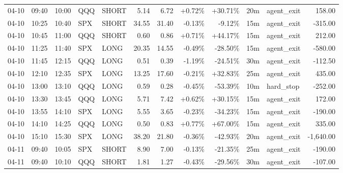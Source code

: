 \documentclass[11pt,a4paper]{article}
\begin{document}
\begin{center}
\begin{longtable}{>{\color{txtmain}}l l l l l r r r r r >{\color{txtmain}}l r}
04-10 & 09:40 & 10:00 & QQQ & SHORT & 5.14 & 6.72 & \textcolor{wingreen}{+0.72\%} & \textcolor{wingreen}{+30.71\%} & 20m & agent\_exit & \textcolor{wingreen}{158.00} \\
04-10 & 10:25 & 10:40 & SPX & SHORT & 34.55 & 31.40 & \textcolor{lossred}{-0.13\%} & \textcolor{lossred}{-9.12\%} & 15m & agent\_exit & \textcolor{lossred}{-315.00} \\
04-10 & 10:45 & 11:00 & QQQ & SHORT & 0.60 & 0.86 & \textcolor{wingreen}{+0.71\%} & \textcolor{wingreen}{+44.17\%} & 15m & agent\_exit & \textcolor{wingreen}{212.00} \\
04-10 & 11:25 & 11:40 & SPX & LONG & 20.35 & 14.55 & \textcolor{lossred}{-0.49\%} & \textcolor{lossred}{-28.50\%} & 15m & agent\_exit & \textcolor{lossred}{-580.00} \\
04-10 & 11:45 & 12:15 & QQQ & LONG & 0.51 & 0.39 & \textcolor{lossred}{-1.19\%} & \textcolor{lossred}{-24.51\%} & 30m & agent\_exit & \textcolor{lossred}{-112.50} \\
04-10 & 12:10 & 12:35 & SPX & LONG & 13.25 & 17.60 & \textcolor{lossred}{-0.21\%} & \textcolor{wingreen}{+32.83\%} & 25m & agent\_exit & \textcolor{wingreen}{435.00} \\
04-10 & 13:00 & 13:10 & QQQ & LONG & 0.59 & 0.28 & \textcolor{lossred}{-0.45\%} & \textcolor{lossred}{-53.39\%} & 10m & hard\_stop & \textcolor{lossred}{-252.00} \\
04-10 & 13:30 & 13:45 & QQQ & LONG & 5.71 & 7.42 & \textcolor{wingreen}{+0.62\%} & \textcolor{wingreen}{+30.15\%} & 15m & agent\_exit & \textcolor{wingreen}{172.00} \\
04-10 & 13:55 & 14:10 & SPX & LONG & 5.55 & 3.65 & \textcolor{lossred}{-0.23\%} & \textcolor{lossred}{-34.23\%} & 15m & agent\_exit & \textcolor{lossred}{-190.00} \\
04-10 & 14:10 & 14:25 & QQQ & LONG & 0.50 & 0.83 & \textcolor{wingreen}{+0.77\%} & \textcolor{wingreen}{+67.00\%} & 15m & agent\_exit & \textcolor{wingreen}{335.00} \\
04-10 & 15:10 & 15:30 & SPX & LONG & 38.20 & 21.80 & \textcolor{lossred}{-0.36\%} & \textcolor{lossred}{-42.93\%} & 20m & agent\_exit & \textcolor{lossred}{-1,640.00} \\
04-11 & 09:40 & 10:05 & SPX & SHORT & 8.90 & 7.00 & \textcolor{lossred}{-0.13\%} & \textcolor{lossred}{-21.35\%} & 25m & agent\_exit & \textcolor{lossred}{-190.00} \\
04-11 & 09:40 & 10:10 & QQQ & SHORT & 1.81 & 1.27 & \textcolor{lossred}{-0.43\%} & \textcolor{lossred}{-29.56\%} & 30m & agent\_exit & \textcolor{lossred}{-107.00} \\

\end{longtable}
\end{center}
\end{document}
